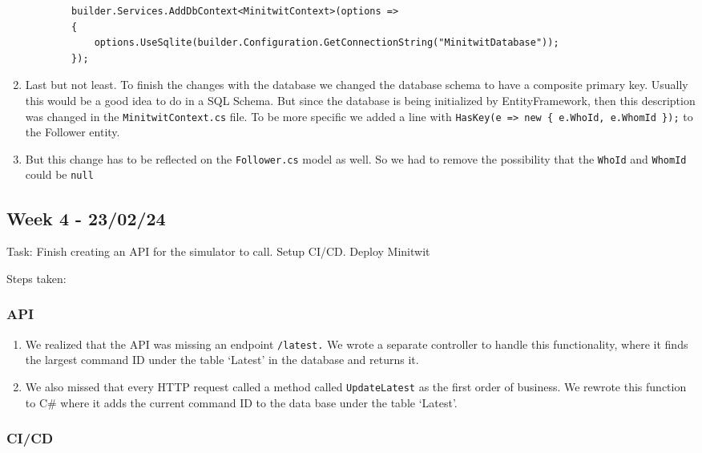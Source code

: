 \begin{enumerate}
    \begin{verbatim}
        builder.Services.AddDbContext<MinitwitContext>(options =>
        {
            options.UseSqlite(builder.Configuration.GetConnectionString("MinitwitDatabase"));
        });
    \end{verbatim}
    \item Last but not least. To finish the changes with the database we changed the database schema to have a composite primary key. Usually this would be a good idea to do in a SQL Schema. But since the database is being initialized by EntityFramework, then this description was changed in the \texttt{MinitwitContext.cs} file. To be more specific we added a line with \texttt{HasKey(e\ =\textgreater{}\ new\ \{\ e.WhoId,\ e.WhomId\ \});} to the Follower entity.
    \item But this change has to be reflected on the \texttt{Follower.cs} model as well. So we had to remove the possibility that the \texttt{WhoId} and \texttt{WhomId} could be \texttt{null}
\end{enumerate}

\subsection{Week 4 - 23/02/24}
\label{log:week4}

Task: Finish creating an API for the simulator to call. Setup CI/CD.
Deploy Minitwit

Steps taken:

\subsubsection{API}
\label{log:api}

\begin{enumerate}
    \item We realized that the API was missing an endpoint \texttt{/latest.} We wrote a separate controller to handle this functionality, where it finds the largest command ID under the table `Latest' in the database and returns it.
    \item We also missed that every HTTP request called a method called \texttt{UpdateLatest} as the first order of business. We rewrote this function to C\# where it adds the current command ID to the data base under the table `Latest'.
\end{enumerate}

\subsubsection{CI/CD}
\label{log:cicd}

